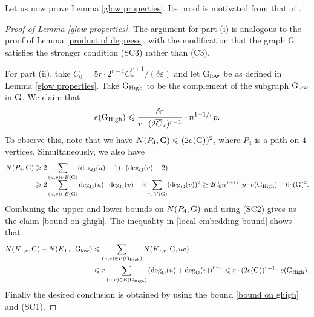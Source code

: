 \documentclass[a4paper,11pt,english,reqno]{amsart}
\numberwithin{equation}{section}
\renewcommand{\leq}{\leqslant}
\renewcommand{\geq}{\geqslant}
\newcommand{\cstar}{\overline{C}_{*}}
\newcommand{\glow}{\textup{G}_{\textup{low}}}
\newcommand{\ghigh}{\textup{G}_{\textup{High}}}
\newcommand{\tu}[1]{\textup{#1}}
\begin{document}
	Let us now prove Lemma \ref{glow properties}. Its proof is motivated from that of \cite[Lemma~4.2]{ABRB}. %
	\begin{proof}[Proof of Lemma \ref{glow properties}]
		The argument for part (i) is analogous to the proof of Lemma \ref{product of degreess}, with the modification that the graph $\tu{G}$ satisfies the stronger condition (SC3) rather than (C3).
		
		For part (ii), take $C_{0}=5r\cdot 2^{r-1}\cstar^{r+1}/(\delta\varepsilon)$ and let $\glow$ be as defined in Lemma \ref{glow properties}.  Take $\ghigh$ to be the complement of the subgraph $\glow$ in $\tu{G}$.  We claim that 
		\begin{equation}
			\label{bound on ghigh}
			e(\ghigh)\leq  \frac{\delta\varepsilon}{r\cdot (2\cstar)^{r-1}} \cdot n^{1+1/r}p.
		\end{equation} To observe this, note that we have $N(P_{4}, \tu{G})\leq (2e(\tu{G}))^{2}$, where $P_{4}$ is a path on $4$ vertices. Simultaneously, we also have 
		\begin{equation*}
			\begin{aligned}
				N(P_{4}, \tu{G}) &\geq 2 \sum_{(u,v) \in E(\tu{G})} (\deg_\tu{G}(u)-1) \cdot (\deg_\tu{G}(v) -2) \\[-6pt]
				&\geq  2 \sum_{(u,v) \in E(\tu{G})} \deg_\tu{G}(u) \cdot \deg_\tu{G}(v) - 3 \sum_{v \in V(\tu{G})} (\deg_\tu{G}(v))^2 
				\ge 2 C_0 n^{1+1/r} p \cdot e(\ghigh)  - 6 e(\tu{G})^2.
			\end{aligned}
		\end{equation*}
		Combining the upper and lower bounds on $N(P_{4}, \tu{G})$ and using (SC2) gives us the claim \eqref{bound on ghigh}. The inequality in \eqref{local embedding bound} shows that
		\begin{equation*}
			\begin{aligned}
				N(K_{1,r}, \tu{G})-N(K_{1,r}, \glow)&\leq \sum_{(u,v)\in E(\ghigh)}N(K_{1,r}, \tu{G}, uv)\\ &\leq r \sum_{(u,v)\in E(\ghigh)}  \left(\tu{deg}_{\tu{G}}(u)+\tu{deg}_{\tu{G}}(v)\right)^{r-1}\leq r\cdot(2e(\tu{G}))^{r-1}\cdot e(\ghigh).
			\end{aligned}
		\end{equation*}
		Finally the desired conclusion is obtained by using the bound \eqref{bound on ghigh} and (SC1).
	\end{proof}
	
	
	
\end{document}
